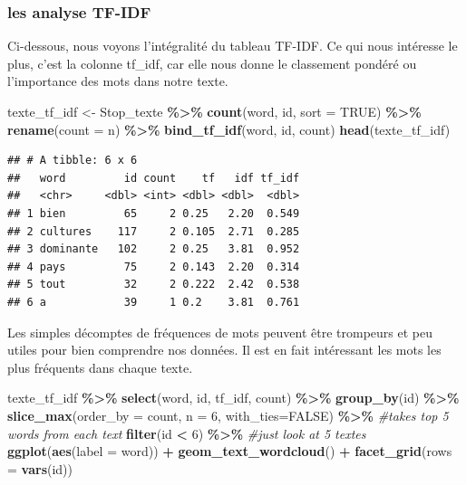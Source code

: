 \documentclass[
]{article}
\newenvironment{Shaded}{\begin{snugshade}}{\end{snugshade}}
\newcommand{\AttributeTok}[1]{\textcolor[rgb]{0.13,0.29,0.53}{#1}}
\newcommand{\CommentTok}[1]{\textcolor[rgb]{0.56,0.35,0.01}{\textit{#1}}}
\newcommand{\ConstantTok}[1]{\textcolor[rgb]{0.56,0.35,0.01}{#1}}
\newcommand{\DecValTok}[1]{\textcolor[rgb]{0.00,0.00,0.81}{#1}}
\newcommand{\FunctionTok}[1]{\textcolor[rgb]{0.13,0.29,0.53}{\textbf{#1}}}
\newcommand{\NormalTok}[1]{#1}
\newcommand{\OtherTok}[1]{\textcolor[rgb]{0.56,0.35,0.01}{#1}}
\newcommand{\SpecialCharTok}[1]{\textcolor[rgb]{0.81,0.36,0.00}{\textbf{#1}}}
\begin{document}
\subsubsection{les analyse TF-IDF}\label{les-analyse-tf-idf}

Ci-dessous, nous voyons l'intégralité du tableau TF-IDF. Ce qui nous
intéresse le plus, c'est la colonne tf\_idf, car elle nous donne le
classement pondéré ou l'importance des mots dans notre texte.

\begin{Shaded}
\begin{Highlighting}[]
\NormalTok{texte\_tf\_idf }\OtherTok{\textless{}{-}}\NormalTok{ Stop\_texte }\SpecialCharTok{\%\textgreater{}\%}
  \FunctionTok{count}\NormalTok{(word, id, }\AttributeTok{sort =} \ConstantTok{TRUE}\NormalTok{) }\SpecialCharTok{\%\textgreater{}\%}
  \FunctionTok{rename}\NormalTok{(}\AttributeTok{count =}\NormalTok{ n) }\SpecialCharTok{\%\textgreater{}\%}
  \FunctionTok{bind\_tf\_idf}\NormalTok{(word, id, count)}
\FunctionTok{head}\NormalTok{(texte\_tf\_idf)}
\end{Highlighting}
\end{Shaded}

\begin{verbatim}
## # A tibble: 6 x 6
##   word         id count    tf   idf tf_idf
##   <chr>     <dbl> <int> <dbl> <dbl>  <dbl>
## 1 bien         65     2 0.25   2.20  0.549
## 2 cultures    117     2 0.105  2.71  0.285
## 3 dominante   102     2 0.25   3.81  0.952
## 4 pays         75     2 0.143  2.20  0.314
## 5 tout         32     2 0.222  2.42  0.538
## 6 a            39     1 0.2    3.81  0.761
\end{verbatim}

Les simples décomptes de fréquences de mots peuvent être trompeurs et
peu utiles pour bien comprendre nos données. Il est en fait intéressant
les mots les plus fréquents dans chaque texte.

\begin{Shaded}
\begin{Highlighting}[]
\NormalTok{texte\_tf\_idf }\SpecialCharTok{\%\textgreater{}\%}
  \FunctionTok{select}\NormalTok{(word, id, tf\_idf, count) }\SpecialCharTok{\%\textgreater{}\%}
  \FunctionTok{group\_by}\NormalTok{(id) }\SpecialCharTok{\%\textgreater{}\%}
  \FunctionTok{slice\_max}\NormalTok{(}\AttributeTok{order\_by =}\NormalTok{ count, }\AttributeTok{n =} \DecValTok{6}\NormalTok{, }\AttributeTok{with\_ties=}\ConstantTok{FALSE}\NormalTok{) }\SpecialCharTok{\%\textgreater{}\%} \CommentTok{\#takes top 5 words from each text}
  \FunctionTok{filter}\NormalTok{(id }\SpecialCharTok{\textless{}} \DecValTok{6}\NormalTok{) }\SpecialCharTok{\%\textgreater{}\%} \CommentTok{\#just look at 5 textes}
  \FunctionTok{ggplot}\NormalTok{(}\FunctionTok{aes}\NormalTok{(}\AttributeTok{label =}\NormalTok{ word)) }\SpecialCharTok{+} 
  \FunctionTok{geom\_text\_wordcloud}\NormalTok{() }\SpecialCharTok{+} 
  \FunctionTok{facet\_grid}\NormalTok{(}\AttributeTok{rows =} \FunctionTok{vars}\NormalTok{(id))}
\end{Highlighting}
\end{Shaded}
\end{document}
